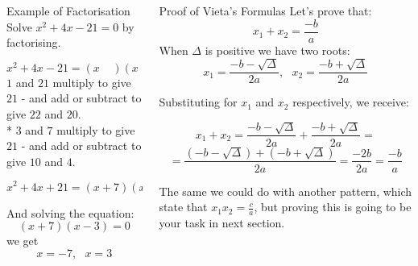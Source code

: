\documentclass[final]{beamer}
\newlength{\onecolwid}
\newlength{\twocolwid}
\begin{document}
\begin{frame}[t]
\begin{columns}[t]
\begin{column}{\twocolwid}
\begin{columns}[t,totalwidth=\twocolwid]
\begin{column}{\onecolwid}
\begin{block}{Example of Factorisation}
Solve $x^2+4x-21=0$ by factorising.

$$x^2+4x-21=(x\ \ \ \ \ )(x\ \ \ \ \ )$$
$1$ and $21$ multiply to give $21$ - and add or subtract to give $22$ and $20$.\\*
$3$ and $7$ multiply to give $21$ - and add or subtract to give $10$ and \textbf{$4$}.

$$x^2+4x+21 = (x+7)(x-3)$$

And solving the equation:
$$(x+7)(x-3)=0$$
we get
$$x=-7,\ \ \ x=3$$

\end{block}


\end{column} %

\begin{column}{\onecolwid} %


\begin{block}{ Proof of Vieta's Formulas}
Let's prove that:
$$x_1 + x_2 = \frac{-b}{a}$$
When $\Delta$ is positive we have two roots:
$$x_1 = \frac{-b-\sqrt{\Delta}}{2a},\ \ \ x_2 = \frac{-b+\sqrt{\Delta}}{2a}$$

Substituting for $x_1$ and $x_2$ respectively, we receive:
                    
$$x_1 + x_2 = \frac{-b-\sqrt{\Delta}}{2a} + \frac{-b+\sqrt{\Delta}}{2a} =$$
$$ = \frac{(-b-\sqrt{\Delta}) + (-b+\sqrt{\Delta})}{2a} = \frac{-2b}{2a} = \frac{-b}{a}$$
                    
The same we could do with another pattern, which state that $x_1 x_2 = \frac{c}{a}$, but proving this is going to be your task in next section.

\end{block}


\end{column} %

\end{columns} %


\end{column}
\end{columns}
\end{frame}
\end{document}
